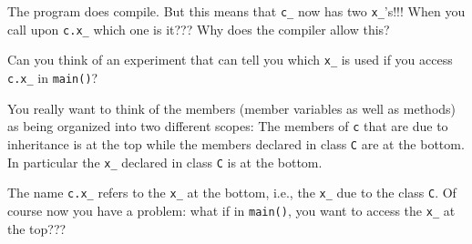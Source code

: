 The program does compile. But this means that \verb!c_! now has two
\verb!x_!'s!!!
When you call upon \verb!c.x_! which one is it??? Why does the compiler
allow this?

\begin{ex} Can you think of an experiment that can tell you
which \verb!x_! is used if you access \verb!c.x_! in \verb!main()!?
\end{ex}
You really want to think of the members (member variables as well as
methods) as being organized into two different scopes:
The members of \verb!c! that are due to inheritance is at the top while
the members declared in class \verb!C! are at the bottom. In particular
the \verb!x_! declared in class \verb!C! is at the bottom.

The name \verb!c.x_! refers to the \verb!x_! at the bottom, i.e., the
\verb!x_! due to the class \verb!C!. Of course now you have a problem:
what if in \verb!main()!, you want to access the \verb!x_! at the
top???


